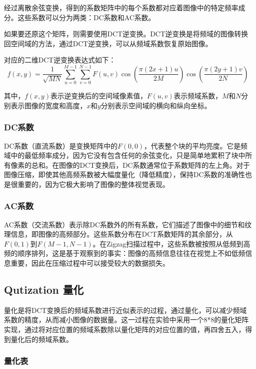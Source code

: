 \documentclass{article}
\begin{document}
经过离散余弦变换，得到的系数矩阵中的每个系数都对应着图像中的特定频率成分。这些系数可以分为两类：DC系数和AC系数。

如果要还原这个矩阵，则需要使用DCT逆变换。DCT逆变换是将频域的图像转换回空间域的方法，通过DCT逆变换，可以从频域系数恢复原始图像。

对应的二维DCT逆变换表达式如下：
\[
f(x,y) = \frac{1}{\sqrt{MN}} \sum_{u=0}^{M-1} \sum_{v=0}^{N-1} F(u,v) \cos\left(\frac{\pi(2x+1)u}{2M}\right) \cos\left(\frac{\pi(2y+1)v}{2N}\right)
\]

其中，$f(x,y)$表示逆变换后的空间域像素值，$F(u,v)$表示频域系数，$M$和$N$分别表示图像的宽度和高度，$x$和$y$分别表示空间域的横向和纵向坐标。


\subsubsection{DC系数}

DC系数（直流系数）是变换矩阵中的$F(0,0)$，代表整个块的平均亮度。它是频域中的最低频率成分，因为它没有包含任何的余弦变化，只是简单地累积了块中所有像素的总和。在图像的DCT变换后，DC系数通常位于系数矩阵的左上角。对于图像压缩，即使其他高频系数被大幅度量化（降低精度），保持DC系数的准确性也是很重要的，因为它极大影响了图像的整体视觉表现。

\subsubsection{AC系数}

AC系数（交流系数）表示除DC系数外的所有系数，它们描述了图像中的细节和纹理信息，即图像的高频部分。这些系数分布在DCT系数矩阵的其余部分，从$F(0,1)$到$F(M-1,N-1)$。在Zigzag扫描过程中，这些系数被按照从低频到高频的顺序排列，这是基于观察到的事实：图像的高频信息往往在视觉上不如低频信息重要，因此在压缩过程中可以接受较大的数据损失。

\subsection{Qutization 量化}

量化是将DCT变换后的频域系数进行近似表示的过程，通过量化，可以减少频域系数的精度，从而减小图像的数据量。这一过程在实验中采用一个8*8的量化矩阵实现，通过将对应位置的频域系数除以量化矩阵的对应位置的值，再四舍五入，得到量化后的频域系数。


\subsubsection{量化表}
\end{document}
